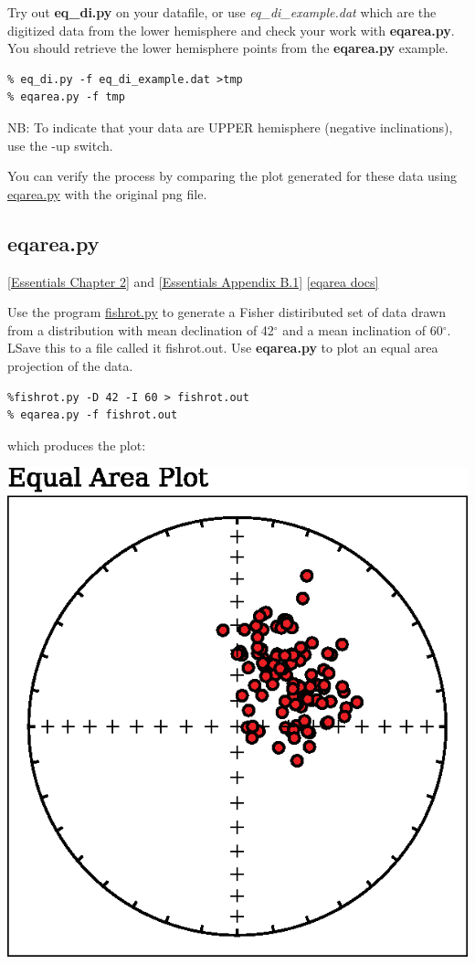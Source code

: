 \documentclass[11pt]{book}
\begin{document}
{{Try out {\bf eq\_di.py} on your datafile, or use {\it eq\_di\_example.dat} which are the digitized data from the lower hemisphere and check your work with {\bf eqarea.py}.  You should retrieve the lower hemisphere points from the {\bf eqarea.py} example.

\begin{verbatim}
% eq_di.py -f eq_di_example.dat >tmp
% eqarea.py -f tmp
\end{verbatim}

NB: To indicate that your data are UPPER hemisphere (negative inclinations), use the -up switch.


You can verify the process by comparing the plot generated for these data using \href{#eqarea.py}{eqarea.py} with the original png file.


%
\subsection{eqarea.py}
\href{http://earthref.org/MAGIC/books/Tauxe/Essentials/WebBook3ch2.html#ch2}{ [Essentials Chapter 2]} and
\href{http://earthref.org/MAGIC/books/Tauxe/Essentials/WebBook3ap1.html#Plots_useful_in_paleomagnetism}{[Essentials Appendix B.1]}
\href{https://github.com/PmagPy/PmagPy/blob/master/programs/eqarea.py}{[eqarea docs]}

Use the program \href{#fishrot.py}{fishrot.py} to generate a Fisher distiributed set of data drawn from a distribution with mean declination of 42$^{\circ}$ and a mean inclination of 60$^{\circ}$.  LSave this to a file called {it fishrot.out}.   Use {\bf eqarea.py} to
plot an equal area projection of the data.

\begin{verbatim}
%fishrot.py -D 42 -I 60 > fishrot.out
% eqarea.py -f fishrot.out
\end{verbatim}

\noindent
which produces the plot:

\includegraphics[width=12 cm]{EPSfiles/eqarea.eps}

}}
\end{document}
